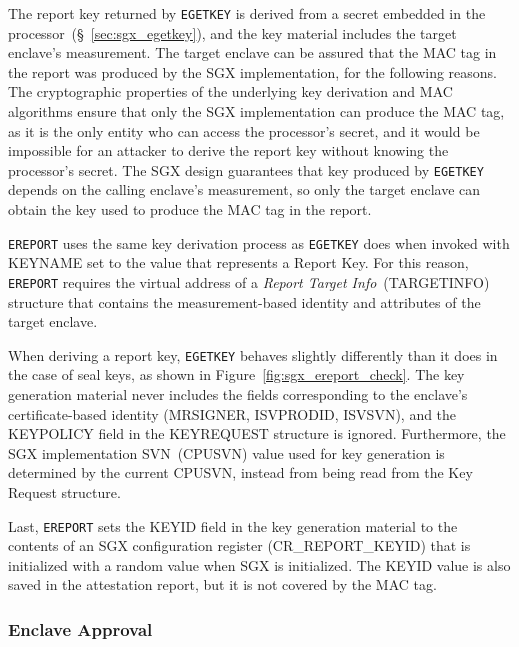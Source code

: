 The report key returned by \texttt{EGETKEY} is derived from a secret embedded
in the processor~(\S~\ref{sec:sgx_egetkey}), and the key material includes the
target enclave's measurement. The target enclave can be assured that the MAC
tag in the report was produced by the SGX implementation, for the following
reasons. The cryptographic properties of the underlying key derivation and
MAC algorithms ensure that only the SGX implementation can produce the MAC tag,
as it is the only entity who can access the processor's secret, and it would be
impossible for an attacker to derive the report key without knowing the
processor's secret. The SGX design guarantees that key produced by
\texttt{EGETKEY} depends on the calling enclave's measurement, so only the
target enclave can obtain the key used to produce the MAC tag in the report.

\texttt{EREPORT} uses the same key derivation process as \texttt{EGETKEY}
does when invoked with KEYNAME set to the value that represents a Report Key.
For this reason, \texttt{EREPORT} requires the virtual address of a
\textit{Report Target Info}~(TARGETINFO) structure that contains the
measurement-based identity and attributes of the target enclave.


When deriving a report key, \texttt{EGETKEY} behaves slightly differently than
it does in the case of seal keys, as shown in
Figure~\ref{fig:sgx_ereport_check}. The key generation material never includes
the fields corresponding to the enclave's certificate-based identity
(MRSIGNER, ISVPRODID, ISVSVN), and the KEYPOLICY field in the KEYREQUEST
structure is ignored. Furthermore, the SGX implementation SVN~(CPUSVN) value
used for key generation is determined by the current CPUSVN, instead from being
read from the Key Request structure.


Last, \texttt{EREPORT} sets the KEYID field in the key generation material to
the contents of an SGX configuration register (CR\_REPORT\_KEYID) that is
initialized with a random value when SGX is initialized. The KEYID value is
also saved in the attestation report, but it is not covered by the MAC tag.


\subsubsection{Enclave Approval}
\label{sec:sgx_launch_enclave}


